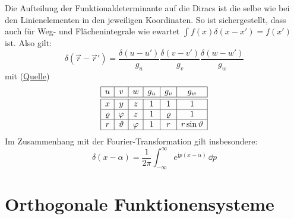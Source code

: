 	  Die Aufteilung der Funktionaldeterminante auf die Diracs ist die selbe wie bei den Linienelementen in den jeweiligen Koordinaten. So ist sichergestellt, dass auch für Weg- und Flächenintegrale wie ewartet $\int f(x)\delta(x-x')=f(x')$ ist. Also gilt:
	  \begin{equation}
	  	\delta(\vec{r}-\vec{r}')=\frac{\delta(u-u')}{g_u}\frac{\delta(v-v')}{g_v}\frac{\delta(w-w')}{g_w}
	  \end{equation}
	  mit (\href{https://www.physik.uni-jena.de/pafmedia/47985/mathematische-methoden-der-physik-ii.pdf}{Quelle})
	  \begin{equation*}
	  	\begin{array}{|c|c|c|c|c|c|}
	  		 \hline u & v & w & g_u & g_v & g_w \\ \hline\hline
	  		 x & y & z & 1 & 1 & 1 \\\hline
	  		 \varrho & \varphi & z & 1 & \varrho & 1 \\\hline
	  		 r & \vartheta & \varphi & 1 & r & r\sin\vartheta\\\hline
	  	\end{array}
	  \end{equation*}
	  Im Zusammenhang mit der Fourier-Transformation gilt insbesondere:
	  \begin{equation}\label{diracft}
	  	\delta(x-\alpha)=\frac{1}{2\pi} \int_{-\infty}^\infty e^{\mathrm{j}p(x-\alpha)}\,\dd p
	  \end{equation}
 \section{Orthogonale Funktionensysteme}\label{orth}
